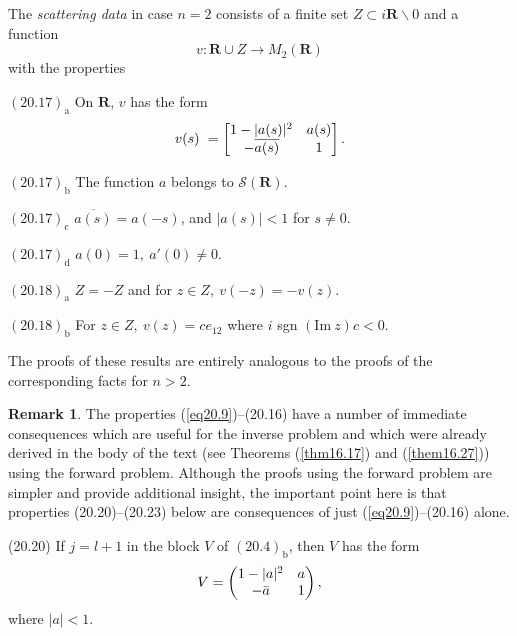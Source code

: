 \documentclass{surv-l}
\theoremstyle{plain}
\theoremstyle{definition}
\newtheorem{remark}[theorem]{Remark}
\numberwithin{equation}{chapter}
\begin{document}
The \emph{scattering data} in case $n=2$ consists of a finite set $Z\subset i \mathbf{R}\backslash 0$ and a function
\begin{equation*}
v:\mathbf{R}\cup Z\rightarrow M_{2}(\mathbf{R})
\end{equation*}
with the properties

$\mathrm{(20.17)_{a}}$ On $\mathbf{R}$, $v$ has the form
\begin{equation*}
v(s)\ =\left[\begin{array}{@{}cc@{}}
1-|a(s)|^{2} & a(s)\\
-\overline{a(s)} & 1
\end{array}\right].
\end{equation*}

$\mathrm{(20.17)_{b}}$ The function $a$ belongs to $\mathscr{S}(\mathbf{R})$.

$\mathrm{(20.17)_{c}}$ $\overline{a(s)}=a(-s)$, and $|a(s)|<1$ for $s\neq 0$.

$\mathrm{(20.17)_{d}}$  $a(0)=1,\ a'(0)\neq 0$.

$\mathrm{(20.18)_{a}}$ $Z=-Z$ and for $z\in Z,\ v(-z)=-v(z)$.

$\mathrm{(20.18)_{b}}$ For $z\in Z,\ v(z)=ce_{12}$ where $i$ sgn $({\mathrm{ Im}}\ z)c<0$.

The proofs of these results are entirely analogous to the proofs of the corresponding facts for $n>2$.
\setcounter{theorem}{18}
\begin{remark}\label{rem20.19}
The properties (\ref{eq20.9})--(20.16) have a number of immediate
consequences which are useful for the inverse problem and which were
already derived in the body of the text (see Theorems (\ref{thm16.17})
and (\ref{them16.27})) using the forward problem. Although the proofs
using the forward problem are simpler and provide additional insight,
the important point here is that properties (20.20)--(20.23) below are
consequences of just (\ref{eq20.9})--(20.16) alone.
\end{remark}

(20.20) If $j=l+1$ in the block $V$ of $(20.4)_{\mathrm{b}}$, then $V$ has the form
\begin{equation*}
V=\left(\begin{array}{@{}cc@{}}
1-|a|^{2} & a\\
-\bar{a} & 1
\end{array}\right),
\end{equation*}
where $|a|<1$.
\end{document}
